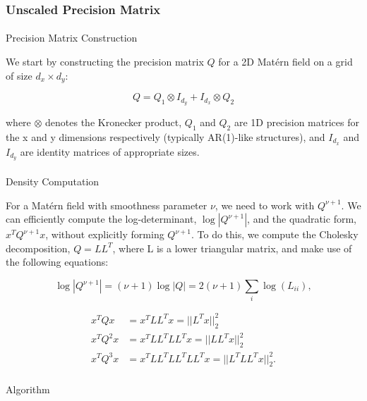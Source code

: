\documentclass[
  letterpaper,
  DIV=11,
  numbers=noendperiod]{scrartcl}
\makeatletter
\let\oldparagraph\paragraph
\renewcommand{\paragraph}{
    \@ifstar
      \xxxParagraphStar
      \xxxParagraphNoStar
  }
\newcommand{\xxxParagraphStar}[1]{\oldparagraph*{#1}\mbox{}}
\newcommand{\xxxParagraphNoStar}[1]{\oldparagraph{#1}\mbox{}}
\makeatother
\begin{document}
\subsubsection{Unscaled Precision
Matrix}\label{unscaled-precision-matrix}

\paragraph{Precision Matrix
Construction}\label{precision-matrix-construction}

We start by constructing the precision matrix \(Q\) for a 2D Matérn
field on a grid of size \(d_x \times d_y\):

\[
Q = Q_1 \otimes I_{d_y} + I_{d_x} \otimes Q_2 
\]

where \(\otimes\) denotes the Kronecker product, \(Q_1\) and \(Q_2\) are
1D precision matrices for the x and y dimensions respectively (typically
AR(1)-like structures), and \(I_{d_x}\) and \(I_{d_y}\) are identity
matrices of appropriate sizes.

\paragraph{Density Computation}\label{density-computation}

For a Matérn field with smoothness parameter \(\nu\), we need to work
with \(Q^{\nu+1}\). We can efficiently compute the log-determinant,
\(\log|Q^{\nu+1}|\), and the quadratic form, \(x^T Q^{\nu+1} x\),
without explicitly forming \(Q^{\nu+1}\). To do this, we compute the
Cholesky decomposition, \(Q = LL^T\), where L is a lower triangular
matrix, and make use of the following equations:

\[
\log|Q^{\nu+1}| = (\nu+1)\log|Q| = 2(\nu+1)\sum_{i}\log(L_{ii}), 
\]

\[
\begin{aligned}
x^T Q x &= x^T L L^T x = ||L^T x||_2^2 \\
x^T Q^2 x &=  x^T L L^T L L^T x = ||LL^T x||_2^2 \\
x^T Q^3 x &=  x^T L L^T L L^T L L^T x = ||L^TLL^T x||_2^2.
\end{aligned}
\]

\paragraph{Algorithm}\label{algorithm}
\end{document}
